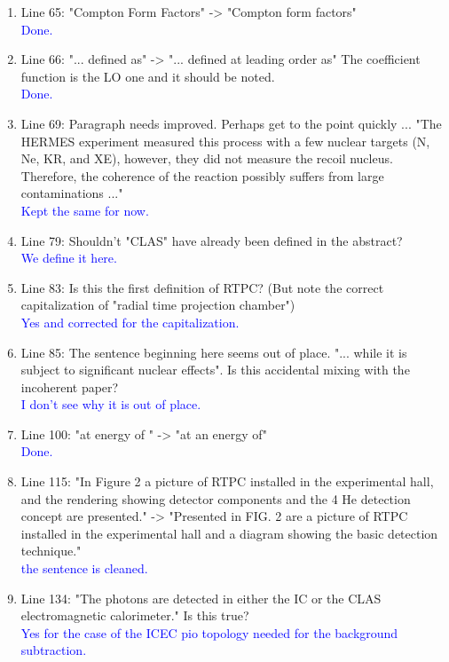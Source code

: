 \documentclass[a4paper,11pt,twoside]{article}
\begin{document}
\begin{enumerate}
\item Line 65: "Compton Form Factors" -> "Compton form factors"\\
\textcolor{blue}{Done. }
  
\item Line 66: "... defined as" -> "... defined at leading order as"
The coefficient function is the LO one and it should be noted.\\
\textcolor{blue}{Done.}
  
\item Line 69: Paragraph needs improved. Perhaps get to the point quickly ...
"The HERMES experiment measured this process with a few nuclear targets
(N, Ne, KR, and XE), however, they did not measure the recoil nucleus.
Therefore, the coherence of the reaction possibly suffers from large
contaminations ..."\\
\textcolor{blue}{Kept the same for now. }
  
\item Line 79: Shouldn't "CLAS" have already been defined in the abstract?\\
\textcolor{blue}{ We define it here.}
  
\item Line 83: Is this the first definition of RTPC? (But note the correct
capitalization of "radial time projection chamber")\\
\textcolor{blue}{ Yes and corrected for the capitalization.}
  
\item Line 85:  The sentence beginning here seems out of place. "... while it
is subject to significant nuclear effects". Is this accidental mixing
with the incoherent paper?\\
\textcolor{blue}{I don't see why it is out of place.}
  
\item Line 100: "at energy of " -> "at an energy of"\\
\textcolor{blue}{Done.}
  
\item Line 115: "In Figure 2 a picture of RTPC installed in the experimental
hall, and the rendering showing detector components and the 4 He
detection concept are presented." ->
"Presented in FIG. 2 are a picture of RTPC installed in the experimental
hall and a diagram showing the basic detection technique."\\
\textcolor{blue}{the sentence is cleaned. }
  
\item Line 134: "The photons are detected in either the IC or
the CLAS electromagnetic calorimeter." Is this true?\\
\textcolor{blue}{Yes for the case of the ICEC pio topology needed for the 
background subtraction. }
  


\end{enumerate}
\end{document}
